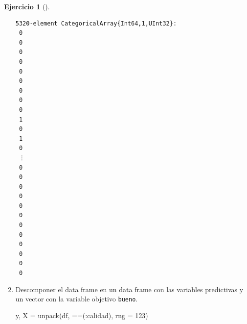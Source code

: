 \documentclass[
  a4paper,
]{scrreport}
\newenvironment{Shaded}{\begin{snugshade}}{\end{snugshade}}
\newcommand{\FloatTok}[1]{\textcolor[rgb]{0.68,0.00,0.00}{#1}}
\newcommand{\FunctionTok}[1]{\textcolor[rgb]{0.28,0.35,0.67}{#1}}
\newcommand{\NormalTok}[1]{\textcolor[rgb]{0.00,0.23,0.31}{#1}}
\newcommand{\OperatorTok}[1]{\textcolor[rgb]{0.37,0.37,0.37}{#1}}
\theoremstyle{definition}
\newtheorem{exercise}{Ejercicio}[chapter]
\theoremstyle{remark}
\begin{document}
\begin{exercise}[]
\begin{enumerate}
\begin{tcolorbox}
\begin{verbatim}
5320-element CategoricalArray{Int64,1,UInt32}:
 0
 0
 0
 0
 0
 0
 0
 0
 0
 1
 0
 1
 0
 ⋮
 0
 0
 0
 0
 0
 0
 0
 0
 0
 0
 0
 0
\end{verbatim}

  \end{tcolorbox}
\item
  Descomponer el data frame en un data frame con las variables
  predictivas y un vector con la variable objetivo \texttt{bueno}.

  \begin{tcolorbox}[enhanced jigsaw, toptitle=1mm, colframe=quarto-callout-tip-color-frame, titlerule=0mm, left=2mm, arc=.35mm, colbacktitle=quarto-callout-tip-color!10!white, opacityback=0, bottomtitle=1mm, toprule=.15mm, coltitle=black, breakable, colback=white, rightrule=.15mm, opacitybacktitle=0.6, leftrule=.75mm, bottomrule=.15mm, title=\textcolor{quarto-callout-tip-color}{\faLightbulb}\hspace{0.5em}{Solución}]

\begin{Shaded}
\begin{Highlighting}[]
\NormalTok{y, X }\OperatorTok{=} \FunctionTok{unpack}\NormalTok{(df, }\OperatorTok{==}\NormalTok{(}\OperatorTok{:}\NormalTok{calidad), rng }\OperatorTok{=} \FloatTok{123}\NormalTok{)}
\end{Highlighting}
\end{Shaded}


\end{tcolorbox}
\end{enumerate}
\end{exercise}
\end{document}
